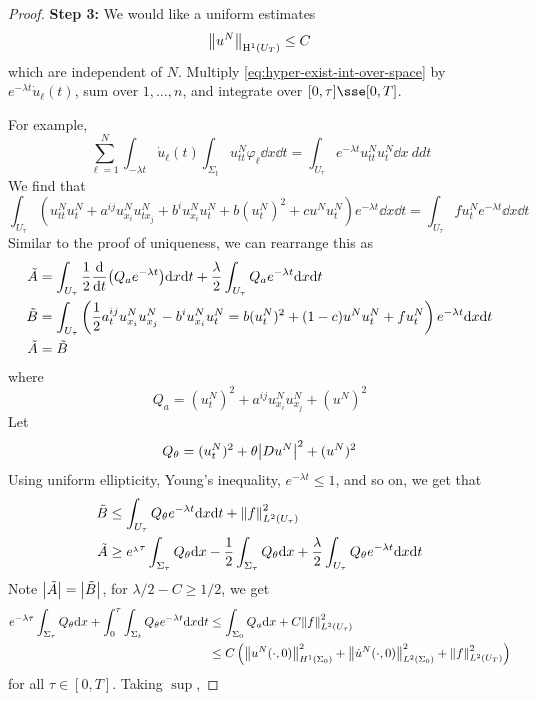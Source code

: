 \documentclass{article}
\begin{document}
\begin{proof}
    \textbf{Step 3:} We would like a uniform estimates
    \[\norm{u^N}_{\mathrm{H}^1(U_T)} \le C\]
    which are independent of \(N\). Multiply \cref{eq:hyper-exist-int-over-space} by \(e^{-\lambda t}\dot u_\ell(t)\), sum over \(1, \dots, n\), and integrate over \([0, \tau] \sse [0, T]\). 

    For example,
    \[\sum_{\ell = 1}^N\int_{-\lambda t}\dot u_\ell(t)\int_{\Sigma_t}u^N_{tt}\varphi_\ell \dd x \dd t = \int_{U_\tau}e^{-\lambda t}u^N_{tt}u^N_t \dd x\ dd t\]
    We find that
    \[\int_{U_\tau}\left(u^N_{tt}u^N_t + a^{ij}u^N_{x_i}u^N_{tx_j} + b^iu^N_{x_i}u^N_t + b(u^N_t)^2 + cu^Nu^N_t\right) e^{-\lambda t}\dd x \dd t =\int_{U_\tau}f u^N_t e^{-\lambda t}\dd x \dd t\]
    Similar to the proof of uniqueness, we can rearrange this as
    \begin{align*}
        \tilde A &= \int_{U_\tau}\frac{1}{2}\dv{t}(Q_ae^{-\lambda t})\dd x \dd t + \frac{\lambda}{2}\int_{U_\tau}Q_ae^{-\lambda t}\dd x \dd t \\
        \tilde B &= \int_{U_\tau}\left(\frac{1}{2}a^{ij}_t u^N_{x_i}u^N_{x_j} - b^iu^N_{x_i} u^N_t = b(u^N_t)^2 + (1-c)u^N u^N_t + fu^N_t\right)e^{-\lambda t} \dd x \dd t \\
        \tilde A &= \tilde B
    \end{align*}
    where
    \[Q_a = (u^N_t)^2 + a^{ij}u^N_{x_i}u^N_{x_j} + (u^N)^2\]
    Let
    \[Q_\theta = (u^N_t)^2 + \theta \abs{Du^N}^2 + (u^N)^2\]
    Using uniform ellipticity, Young's inequality, \(e^{-\lambda t} \le 1\), and so on, we get that
    \begin{align*}
        \tilde B &\le \int_{U_\tau}Q_\theta e^{-\lambda t} \dd x \dd t + \norm{f}_{L^2(U_\tau)}^2 \\
        \tilde A&\ge e^{_\lambda\tau}\int_{\Sigma_\tau}Q_\theta\dd x - \frac{1}{2}\int_{\Sigma_\tau}Q_\theta \dd x + \frac{\lambda}{2}\int_{U_\tau}Q_\theta e^{-\lambda t}\dd x \dd t
    \end{align*}
    Note \(\abs{\tilde A} = \abs{\tilde B}\), for \(\lambda/2 - C \ge 1/2\), we get
    \begin{align*}
        e^{-\lambda \tau}\int_{\Sigma_\tau}Q_\theta \dd x + \int_0^\tau \int_{\Sigma_t}Q_\theta e^{-\lambda t} \dd x \dd t &\le \int_{\Sigma_0}Q_a \dd x + C\norm{f}^2_{L^2(U_\tau)} \\
        &\le C\left(\norm{u^N(\cdot, 0)}^2_{H^1(\Sigma_0)} + \norm{\dot u^N(\cdot, 0)}^2_{L^2(\Sigma_0)} + \norm{f}^2_{L^2(U_T)}\right)
    \end{align*}
    for all \(\tau \in [0, T]\). Taking \(\sup\),

\end{proof}
\end{document}
